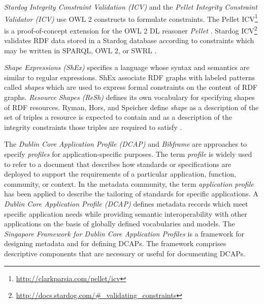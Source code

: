 \documentclass[a4paper,fontsize=11pt]{scrartcl}
\begin{document}
\emph{Stardog Integrity Constraint Validation (ICV)} and the \emph{Pellet Integrity Constraint Validator (ICV)} use OWL 2 constructs to formulate constraints. The Pellet ICV\footnote{\url{http://clarkparsia.com/pellet/icv}} is a proof-of-concept extension for the OWL 2 DL reasoner \emph{Pellet} \cite{sirin2007pellet}. Stardog ICV\footnote{\url{http://docs.stardog.com/#_validating_constraints}} validates RDF data stored in a Stardog database according to constraints which may be written in SPARQL, OWL 2, or SWRL \cite{Horrocks04}. 

\emph{Shape Expressions (ShEx)} \cite{W3C-ShEx-Primer-2014,W3C-ShEx-Definition-2014,Prud'hommeaux-2014,Boneva-2014} specifies a language whose syntax and semantics are similar to regular expressions. ShEx associate RDF graphs with labeled patterns called \emph{shapes} which are used to express formal constraints on the content of RDF graphs. \emph{Resource Shapes (ReSh)} \cite{W3C-ReSh-2014} defines its own vocabulary for specifying shapes of RDF resources. Ryman, Hors, and Speicher define \emph{shape} as a description of the set of triples a resource is expected to contain and as a description of the integrity constraints those triples are required to satisfy \cite{Ryman2013}. 

The \emph{Dublin Core Application Profile (DCAP)} and \emph{Bibframe} are approaches to specify \emph{profiles} for application-specific purposes. The term \emph{profile} is widely used to refer to a document that describes how standards or specifications are deployed to support the requirements of a particular application, function, community, or context. In the metadata community, the term \emph{application profile} has been applied to describe the tailoring of standards for specific applications. A \emph{Dublin Core Application Profile (DCAP)} \cite{DCMI-DCAP-2009} defines metadata records which meet specific application needs while providing semantic interoperability with other applications on the basis of globally defined vocabularies and models. The \emph{Singapore Framework for Dublin Core Application Profiles} \cite{DCMI-Singapore-2008} is a framework for designing metadata and for defining DCAPs. The framework comprises descriptive components that are necessary or useful for documenting DCAPs.
\end{document}
